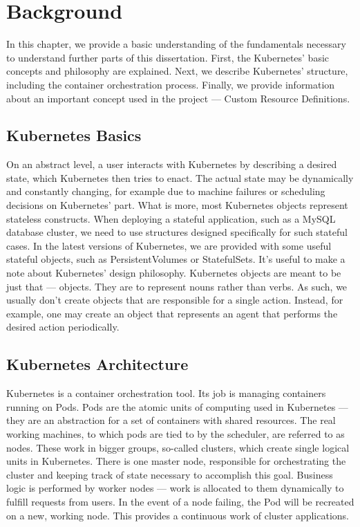 \chapter{Background}

In this chapter, we provide a basic understanding of the fundamentals necessary to understand
further parts of this dissertation. First, the Kubernetes’ basic concepts and philosophy are
explained. Next, we describe Kubernetes’ structure, including the container orchestration process.
Finally, we provide information about an important concept used in the project --- Custom Resource
Definitions.

\section{Kubernetes Basics}
On an abstract level, a user interacts with Kubernetes by describing a desired state, which
Kubernetes then tries to enact. The actual state may be dynamically and constantly changing, for
example due to machine failures or scheduling decisions on Kubernetes' part. What is more, most
Kubernetes objects represent stateless constructs. When deploying a stateful application, such as a
MySQL database cluster, we need to use structures designed specifically for such stateful cases. In
the latest versions of Kubernetes, we are provided with some useful stateful objects, such as
PersistentVolumes or StatefulSets. It’s useful to make a note about Kubernetes’ design philosophy.
Kubernetes objects are meant to be just that --- objects. They are to represent nouns rather than
verbs. As such, we usually don’t create objects that are responsible for a single action. Instead,
for example, one may create an object that represents an agent that performs the desired action
periodically.

\section{Kubernetes Architecture}

Kubernetes is a container orchestration tool. Its job is managing containers running on Pods. Pods
are the atomic units of computing used in Kubernetes --- they are an abstraction for a set of
containers with shared resources. The real working machines, to which pods are tied to by the
scheduler, are referred to as nodes. These work in bigger groups, so-called clusters, which
create single logical units in Kubernetes. There is one master node, responsible for orchestrating
the cluster and keeping track of state necessary to accomplish this goal. Business logic is
performed by worker nodes --- work is allocated to them dynamically to fulfill requests from users.
In the event of a node failing, the Pod will be recreated on a new, working node. This provides a
continuous work of cluster applications.

